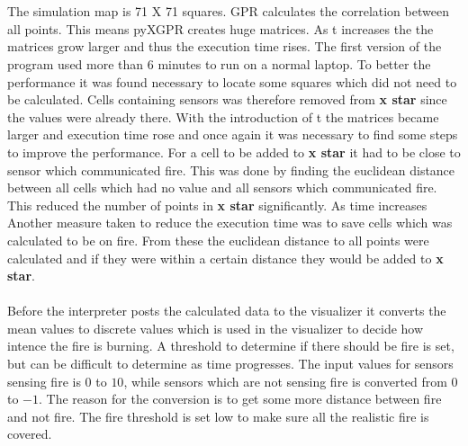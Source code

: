 \\\\
The simulation map is 71 X 71 squares. GPR calculates the correlation between all points. This means pyXGPR creates huge matrices. As t increases the the matrices grow larger and thus the execution time rises. The first version of the program used more than 6 minutes to run on a normal laptop. To better the performance it was found necessary to locate some squares which did not need to be calculated. Cells containing sensors was therefore removed from \textbf{x star} since the values were already there. With the introduction of t the matrices became larger and execution time rose and once again it was necessary to find some steps to improve the performance. For a cell to be added to \textbf{x star} it had to be close to sensor which communicated fire. This was done by finding the euclidean distance between all cells which had no value and all sensors which communicated fire. This reduced the number of points in \textbf{x star} significantly. As time increases Another measure taken to reduce the execution time was to save cells which was calculated to be on fire. From these the euclidean distance to all points were calculated and if they were within a certain distance they would be added to \textbf{x star}.
\\\\
Before the interpreter posts the calculated data to the visualizer it converts the mean values to discrete values which is used in the visualizer to decide how intence the fire is burning. A threshold to determine if there should be fire is set, but can be difficult to determine as time progresses. The input values for sensors sensing fire is $0 $ to $10$, while sensors which are not sensing fire is converted from $ 0 $ to $ -1 $. The reason for the conversion is to get some more distance between fire and not fire. The fire threshold is set low to make sure all the realistic fire is covered.
\\\\
